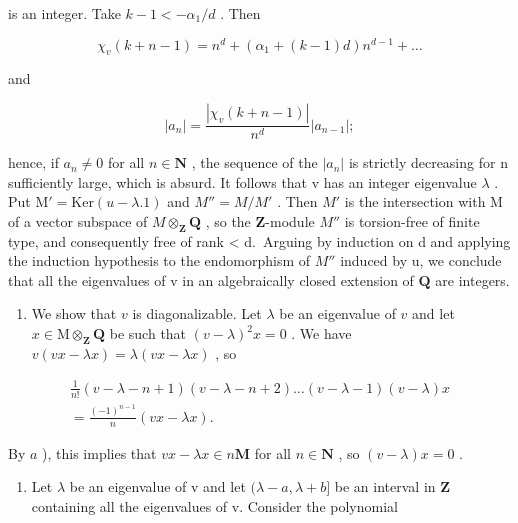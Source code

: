 is an integer. Take \(k - 1 < -\alpha_{1} / d\) . Then

\[
\chi_ {v} (k + n - 1) = n ^ {d} + (\alpha_ {1} + (k - 1) d) n ^ {d - 1} + \dots
\]

and

\[
| a _ {n} | = \frac {| \chi_ {v} (k + n - 1) |}{n ^ {d}} | a _ {n - 1} |;
\]

hence, if \(a_{n} \neq 0\) for all \(n \in \mathbf{N}\) , the sequence of the \(|a_{n}|\) is strictly decreasing for n sufficiently large, which is absurd. It follows that v has an integer eigenvalue \(\lambda\) . Put \(\mathrm{M}' = \mathrm{Ker}(u - \lambda.1)\) and \(M'' = M/M'\) . Then \(M'\) is the intersection with M of a vector subspace of \(M \otimes_{\mathbf{Z}} \mathbf{Q}\) , so the \(\mathbf{Z}\)-module \(M''\) is torsion-free of finite type, and consequently free of rank \textless{} d.~Arguing by induction on d and applying the induction hypothesis to the endomorphism of \(M''\) induced by u, we conclude that all the eigenvalues of v in an algebraically closed extension of \(\mathbf{Q}\) are integers.

\begin{enumerate}
\def\labelenumi{\alph{enumi})}
\setcounter{enumi}{2}
\tightlist
\item
  We show that \(v\) is diagonalizable. Let \(\lambda\) be an eigenvalue of \(v\) and let \(x \in \mathrm{M} \otimes_{\mathbf{Z}} \mathbf{Q}\) be such that \((v - \lambda)^2 x = 0\) . We have \(v(vx - \lambda x) = \lambda(vx - \lambda x)\) , so
\end{enumerate}

\[
\begin{array}{c} \frac {1}{n !} (v - \lambda - n + 1) (v - \lambda - n + 2) \ldots (v - \lambda - 1) (v - \lambda) x \\ = \frac {(- 1) ^ {n - 1}}{n} (v x - \lambda x). \end{array}
\]

By \(a\) ), this implies that \(vx - \lambda x \in n\mathbf{M}\) for all \(n \in \mathbf{N}\) , so \((v - \lambda)x = 0\) .

\begin{enumerate}
\def\labelenumi{\alph{enumi})}
\setcounter{enumi}{3}
\tightlist
\item
  Let \(\lambda\) be an eigenvalue of v and let \((\lambda - a, \lambda + b]\) be an interval in \(\mathbf{Z}\) containing all the eigenvalues of v. Consider the polynomial
\end{enumerate}

